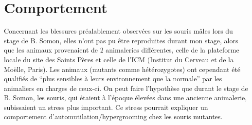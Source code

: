 \section{Comportement}
\label{sec:Comportement}
Concernant les blessures préalablement observées sur les souris \mcrd mâles lors du stage de B. Somon, elles n'ont pas pu être reproduites durant mon stage, alors que les animaux provenaient de 2 animaleries différentes, celle de la plateforme locale du site des Saints Pères et celle de l’ICM (Institut du Cerveau et de la Moëlle, Paris). Les animaux (mutants comme hétérozygotes) ont cependant été qualifiés de \enquote{plus sensibles à leurs environnement que la normale} par les animaliers en charges de ceux-ci. On peut faire l'hypothèse que durant le stage de B. Somon, les souris, qui étaient à l'époque élevées dans une ancienne animalerie, subissaient un stress plus important. Ce stress pourrait expliquer un comportement d'automutilation/hypergrooming chez les souris mutantes. 
\clearpage